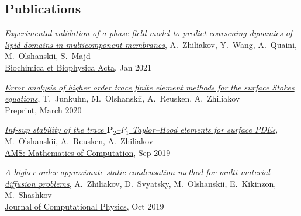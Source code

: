 \documentclass[a4paper,12pt]{article}
\begin{document}
	\subsection*{Publications}
	
	\begin{etaremune}[topsep=0pt]
		\item \textit{\href{https://arxiv.org/abs/2006.14125}{Experimental validation of a phase-field model to predict coarsening dynamics of lipid domains in multicomponent membranes}}, A.~Zhiliakov, Y.~Wang, A.~Quaini, M.~Olshanskii, S.~Majd\\
		\href{https://doi.org/10.1016/j.bbamem.2020.183446}{Biochimica et Biophysica Acta}, Jan 2021
		\item \textit{\href{https://arxiv.org/abs/2003.06972}{Error analysis of higher order trace finite element methods for the surface Stokes equations}}, T.~Junkuhn, M.~Olshanskii, A.~Reusken, A.~Zhiliakov\\ Preprint, March 2020
		\item \textit{\href{https://arxiv.org/abs/1909.02990}{Inf-sup stability of the trace $\mathbf P_2$--$P_1$ Taylor--Hood elements for surface PDEs}}, M.~Olshanskii, A.~Reusken, A.~Zhiliakov\\ \href{https://doi.org/10.1090/mcom/3551}{AMS: Mathematics of Computation}, Sep 2019 
		\item \textit{\href{https://www.researchgate.net/publication/333900759_A_higher_order_approximate_static_condensation_method_for_multi-material_diffusion_problems}{A higher order approximate static condensation method for multi-material diffusion problems}}, A.~Zhiliakov, D.~Svyatsky, M.~Olshanskii, E.~Kikinzon, M.~Shashkov\\ \href{https://doi.org/10.1016/j.jcp.2019.06.044}{Journal of Computational Physics}, Oct 2019 

\end{etaremune}
\end{document}
